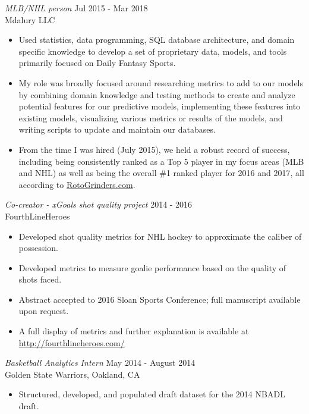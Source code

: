\documentclass[margin]{res}
\begin{document}
\begin{resume}
\textit{MLB/NHL person} \hfill Jul 2015 - Mar 2018
\\Mdalury LLC
\begin{itemize}
\item[-] Used statistics, data programming, SQL database architecture, and domain specific knowledge to develop a set of proprietary data, models, and tools primarily focused on Daily Fantasy Sports.
\item[-] My role was broadly focused around researching metrics to add to our models by combining domain knowledge and testing methods to create and analyze potential features for our predictive models, implementing these features into existing models, visualizing various metrics or results of the models, and writing scripts to update and maintain our databases.
\item[-] From the time I was hired (July 2015), we held a robust record of success, including being consistently ranked as a Top 5 player in my focus areas (MLB and NHL) as well as being the overall \#1 ranked player for 2016 and 2017, all according to \href{https://rotogrinders.com/profiles/saahilsud}{RotoGrinders.com}.
\end{itemize}

\textit{Co-creator - xGoals shot quality project} \hfill 2014 - 2016
\\ FourthLineHeroes
\begin{itemize}
\item[-] Developed shot quality metrics for NHL hockey to approximate the caliber of possession.
\vspace{-3pt}\item[-] Developed metrics to measure goalie performance based on the quality of shots faced.
\vspace{-3pt}\item[-] Abstract accepted to 2016 Sloan Sports Conference; full manuscript available upon request.
\vspace{-13pt}\item[-] A full display of metrics and further explanation is available at \href{http://fourthlineheroes.com/}{http://fourthlineheroes.com/}
\end{itemize}

\textit{Basketball Analytics Intern} \hfill May 2014 - August 2014
\\Golden State Warriors, Oakland, CA
\begin{itemize}
\item[-] Structured, developed, and populated draft dataset for the 2014 NBADL draft.
\end{itemize}


\end{resume}
\end{document}
